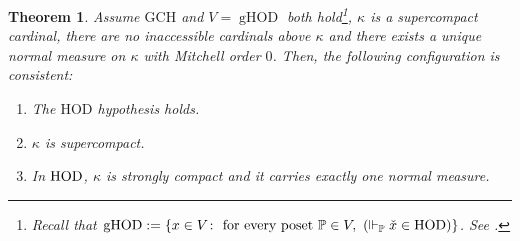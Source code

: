 \documentclass[11pt]{amsart}
\newtheorem{theorem}{Theorem}[section]
\theoremstyle{definition}
\theoremstyle{remark}
\newcommand\HOD{\textnormal{HOD}}
\newcommand\<{{<}}
\DeclareMathOperator{\gHOD}{gHOD}
\newcommand{\po}{\mathbb{P}}
\begin{document}
\begin{theorem}\label{thm: Hod hypothesis}
Assume $\mathrm{GCH}$ and $V=\gHOD$ both hold\footnote{Recall that ${\rm{gHOD}} := \{ x\in V \colon \text{ for every poset }\po\in V, \ (\Vdash_{\po}  \check{x}\in {\rm{HOD}}) \}$. See \cite{Geology}.}, $\kappa$ is a supercompact cardinal, {there are no inaccessible cardinals above $\kappa$} and there exists a unique normal measure on $\kappa$ with Mitchell order $0$. Then, the following configuration is consistent:
    \begin{enumerate}
        \item The $\mathrm{HOD}$ hypothesis holds.
        \item $\kappa$ is supercompact.
        \item In $\HOD$, $\kappa$ is strongly compact  and it carries exactly one normal measure.
    \end{enumerate}    
\end{theorem}
\end{document}

